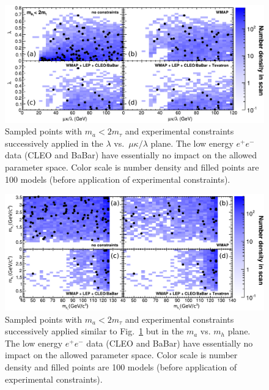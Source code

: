 \documentclass[aps,prl,twocolumn,nofootinbib,superscriptaddress]{revtex4}
\begin{document}
\begin{figure}[htb]
\includegraphics[width=0.87\linewidth]{plots/fourconstraints_params}
\caption{Sampled points with $m_a < 2m_\tau$ and experimental constraints successively applied 
in the $\lambda$ vs.\ $\mu\kappa/\lambda$ plane. The low energy $e^+e^-$ data (CLEO and
BaBar) have essentially no impact on the allowed parameter space. Color scale is number density 
and filled points are 100 models (before application of experimental 
constraints). \label{fig:exclusion_params}}
\end{figure}
\begin{figure}[hbt]
\includegraphics[width=0.87\linewidth]{plots/fourconstraints_masses}
\caption{Sampled points with $m_a < 2m_\tau$ and experimental constraints successively applied 
similar to Fig.~\ref{fig:exclusion_params} but in the $m_a$ vs. $m_h$ plane.  The low 
energy $e^+e^-$ data (CLEO and BaBar) have essentially no impact on the allowed parameter space. 
Color scale is number density and filled points are 100 models (before application of experimental 
constraints). \label{fig:exclusion_mass}}
\end{figure}
\end{document}
